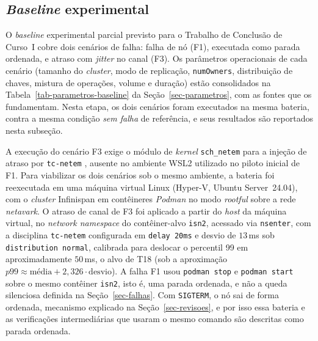 \subsection*{\emph{Baseline} experimental}
\label{sec-baseline-estado}

O \emph{baseline} experimental parcial previsto para o Trabalho de Conclusão de Curso~I cobre dois cenários de falha: falha de nó (F1), executada como parada ordenada, e atraso com \emph{jitter} no canal (F3). Os parâmetros operacionais de cada cenário (tamanho do \emph{cluster}, modo de replicação, \texttt{numOwners}, distribuição de chaves, mistura de operações, volume e duração) estão consolidados na Tabela~\ref{tab-parametros-baseline} da Seção~\ref{sec-parametros}, com as fontes que os fundamentam. Nesta etapa, os dois cenários foram executados na mesma bateria, contra a mesma condição \emph{sem falha} de referência, e seus resultados são reportados nesta subseção.

A execução do cenário F3 exige o módulo de \emph{kernel} \texttt{sch\_netem} para a injeção de atraso por \texttt{tc-netem} \citep{netem_manpage}, ausente no ambiente WSL2 utilizado no piloto inicial de F1. Para viabilizar os dois cenários sob o mesmo ambiente, a bateria foi reexecutada em uma máquina virtual Linux (Hyper-V, Ubuntu Server~24.04), com o \emph{cluster} Infinispan em contêineres \emph{Podman} no modo \emph{rootful} sobre a rede \emph{netavark}. O atraso de canal de F3 foi aplicado a partir do \emph{host} da máquina virtual, no \emph{network namespace} do contêiner-alvo \texttt{isn2}, acessado via \texttt{nsenter}, com a disciplina \texttt{tc-netem} configurada em \texttt{delay 20ms} e desvio de $13$\,ms sob \texttt{distribution normal}, calibrada para deslocar o percentil 99 em aproximadamente $50$\,ms, o alvo de T18 (sob a aproximação $p99 \approx \text{média} + 2{,}326 \cdot \text{desvio}$). A falha F1 usou \texttt{podman stop} e \texttt{podman start} sobre o mesmo contêiner \texttt{isn2}, isto é, uma parada ordenada, e não a queda silenciosa definida na Seção~\ref{sec-falhas}.  Com \texttt{SIGTERM}, o nó sai de forma ordenada, mecanismo explicado na Seção~\ref{sec-revisoes}, e por isso essa bateria e as verificações intermediárias que usaram o mesmo comando são descritas como parada ordenada.

